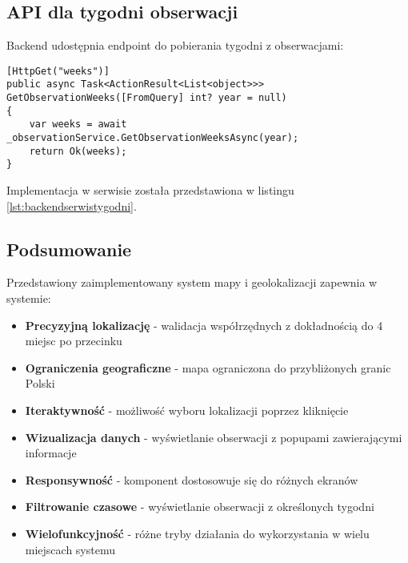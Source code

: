 \subsection{API dla tygodni obserwacji}
Backend udostępnia endpoint do pobierania tygodni z obserwacjami:

\begin{lstlisting}[style=csharp, caption={Kod kontrolera tygodni}]
[HttpGet("weeks")]
public async Task<ActionResult<List<object>>> GetObservationWeeks([FromQuery] int? year = null)
{
	var weeks = await _observationService.GetObservationWeeksAsync(year);
	return Ok(weeks);
}
\end{lstlisting}

Implementacja w serwisie została przedstawiona w listingu \ref{lst:backendserwistygodni}.

\subsection{Podsumowanie}
Przedstawiony zaimplementowany system mapy i geolokalizacji zapewnia w systemie:

\begin{itemize}
	\item \textbf{Precyzyjną lokalizację} - walidacja współrzędnych z dokładnością do 4 miejsc po przecinku
	\item \textbf{Ograniczenia geograficzne} - mapa ograniczona do przybliżonych granic Polski
	\item \textbf{Iteraktywność} - możliwość wyboru lokalizacji poprzez kliknięcie
	\item \textbf{Wizualizacja danych} - wyświetlanie obserwacji z popupami zawierającymi informacje
	\item \textbf{Responsywność} - komponent dostosowuje się do różnych ekranów
	\item \textbf{Filtrowanie czasowe} - wyświetlanie obserwacji z określonych tygodni
	\item \textbf{Wielofunkcyjność} - różne tryby działania do wykorzystania w wielu miejscach systemu
\end{itemize}